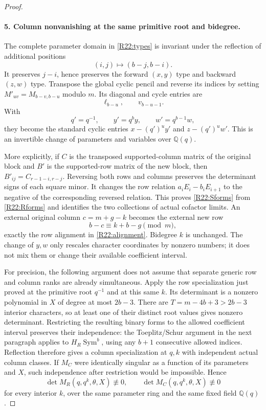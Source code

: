 \documentclass[11pt,a4paper]{article}
\theoremstyle{definition}\newtheorem{definition}{Definition}
\begin{document}
\begin{proof}
\paragraph{5. Column nonvanishing at the same primitive root and bidegree.}
The complete parameter domain in \eqref{R22:types} is invariant under
the reflection of additional positions
\begin{equation}\label{R22:reflection}
 (i,j)\longmapsto(b-j,b-i).
\end{equation}
It preserves $j-i$, hence preserves the forward $(x,y)$ type and
backward $(z,w)$ type. Transpose the global cyclic pencil and reverse
its indices by setting $M'_{uv}=M_{b-v,b-u}$ modulo $m$.
Its diagonal and cycle entries are
\[
 \ell_{b-u},\qquad v_{b-u-1}.
\]
With
\[
 q'=q^{-1},\qquad y'=q^by,\qquad w'=q^{b-1}w,
\]
they become the standard cyclic entries $x-(q')^uy'$ and
$z-(q')^uw'$. This is an invertible change of parameters and variables
over $\mathbb Q(q)$.

More explicitly, if $C$ is the transposed supported-column matrix of
the original block and $B'$ is the supported-row matrix of the new
block, then $B'_{ij}=C_{r-1-i,r-j}$. Reversing both rows and columns
preserves the determinant signs of each square minor. It changes the
row relation $a_iE_i-b_iE_{i+1}$ to the negative of the corresponding
reversed relation. This proves \eqref{R22:Sforms} from
\eqref{R22:Rforms} and identifies the two collections of actual
cofactor limits. An external original column $c=m+g-k$ becomes the
external new row
\[
 b-c\equiv k+b-g\pmod m,
\]
exactly the row alignment in \eqref{R22:alignment}. Bidegree $k$ is
unchanged. The change of $y,w$ only rescales character coordinates by
nonzero numbers; it does not mix them or change their available
coefficient interval.

For precision, the following argument does not assume that separate
generic row and column ranks are already simultaneous. Apply the
row specialization just proved at the primitive root $q^{-1}$ and
at this same $k$. Its determinant is a nonzero polynomial in $X$
of degree at most $2b-3$. There are $T=m-4b+3>2b-3$ interior
characters, so at least one of their distinct root values gives
nonzero determinant. Restricting the resulting binary forms to the
allowed coefficient interval preserves their independence: the
Toeplitz/Schur argument in the next paragraph applies to
$H_R\operatorname{Sym}^b$, using any $b+1$ consecutive allowed
indices. Reflection therefore gives a column specialization at $q,k$
with independent actual column classes. If $M_C$ were identically
singular as a function of its parameters and $X$, such independence
after restriction would be impossible. Hence
\begin{equation}\label{R22:two_nonzero}
 \det M_R(q,q^k,\theta,X)\not\equiv0,
 \qquad
 \det M_C(q,q^k,\theta,X)\not\equiv0
\end{equation}
for every interior $k$, over the same parameter ring and the same
fixed field $\mathbb Q(q)$.


\end{proof}
\end{document}
